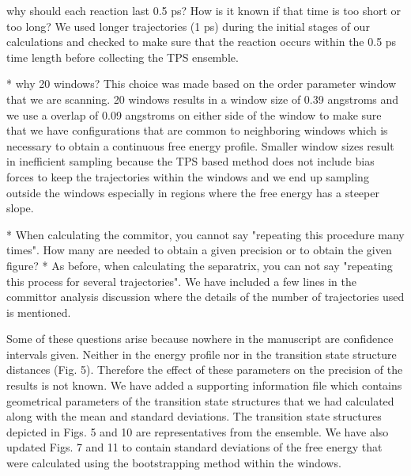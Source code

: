 \documentclass[journal=jpcbfk,manuscript=article,layout=traditional]{achemso}
\begin{document}
\begin{response}
  {why should each reaction last 0.5 ps? How is it known if that time is too short 
  or too long?}
We used longer trajectories (1 ps) during the initial stages of our calculations
and checked to make sure that the reaction occurs within
the 0.5 ps time length before collecting the TPS ensemble. 
\end{response}

{\begin{response}
{* why 20 windows?}
This choice was made based on the order parameter window that we are scanning.
20 windows results in a window size of 0.39 angstroms and we use a overlap of
0.09 angstroms on either side of the window to make sure that we have configurations
that are common to neighboring windows which is necessary to obtain a continuous free energy
profile. Smaller window sizes result in inefficient sampling because the TPS based method
does not include bias forces to keep the trajectories within the windows and we end up
sampling outside the windows especially in regions where the free energy has a steeper slope.  
\end{response}

\begin{response}
{* When calculating the commitor, you cannot say "repeating this procedure many times". 
How many are needed to obtain a given precision or to obtain the given figure?
\newline
* As before, when calculating the separatrix, you can not say "repeating this 
process for several trajectories".}
We have included a few lines in the committor analysis 
discussion where the details of the number of trajectories used is mentioned.  
\end{response}

\begin{response}{Some of these questions arise because nowhere in 
the manuscript are confidence intervals given. Neither in the energy 
profile nor in the transition state structure distances (Fig. 5). 
Therefore the effect of these parameters on the precision of the 
results is not known.
}
We have added a supporting information file which contains geometrical 
parameters of the transition state structures that we had calculated 
along with the mean and standard deviations. 
The transition state structures depicted in Figs. 5 and 10 are 
representatives from the ensemble. We have also updated Figs. 7 
and 11 to contain standard deviations of the free energy that were
calculated using the bootstrapping method within the windows.  
\end{response}

}
\end{document}
